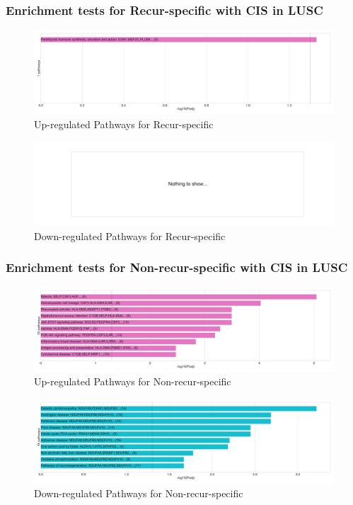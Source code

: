 \documentclass{beamer}
\begin{document}
    \begin{frame}
        \frametitle{Enrichment tests for Recur-specific with CIS in LUSC}

        \begin{figure}
            \includegraphics[width=0.8 \linewidth]{figures/DEG/Enrichment/STAR.FPKM.SQC-CIS.Recur.Up.KEGG.pdf}
            \caption{Up-regulated Pathways for Recur-specific}
        \end{figure}

        \begin{figure}
            \includegraphics[width=0.8 \linewidth]{figures/DEG/Enrichment/STAR.FPKM.SQC-CIS.Recur.Down.KEGG.pdf}
            \caption{Down-regulated Pathways for Recur-specific}
        \end{figure}
    \end{frame}

    \begin{frame}
        \frametitle{Enrichment tests for Non-recur-specific with CIS in LUSC}

        \begin{figure}
            \includegraphics[width=0.8 \linewidth]{figures/DEG/Enrichment/STAR.FPKM.SQC-CIS.Nonrecur.Up.KEGG.pdf}
            \caption{Up-regulated Pathways for Non-recur-specific}
        \end{figure}

        \begin{figure}
            \includegraphics[width=0.8 \linewidth]{figures/DEG/Enrichment/STAR.FPKM.SQC-CIS.Nonrecur.Down.KEGG.pdf}
            \caption{Down-regulated Pathways for Non-recur-specific}
        \end{figure}
    \end{frame}
\end{document}
